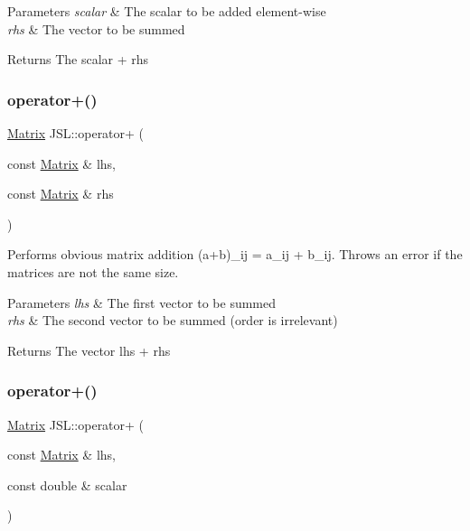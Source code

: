 \begin{DoxyParams}{Parameters}
{\em scalar} & The scalar to be added element-\/wise \\
\hline
{\em rhs} & The vector to be summed \\
\hline
\end{DoxyParams}
\begin{DoxyReturn}{Returns}
The scalar + rhs 
\end{DoxyReturn}
\mbox{\label{namespaceJSL_ad1bcc74167579ecff71209bf8c9c47a3}} 
\subsubsection{\texorpdfstring{operator+()}{operator+()}\hspace{0.1cm}{\footnotesize\ttfamily [4/6]}}
{\footnotesize\ttfamily \hyperlink{classJSL_1_1Matrix}{Matrix} J\+S\+L\+::operator+ (\begin{DoxyParamCaption}\item[{const \hyperlink{classJSL_1_1Matrix}{Matrix} \&}]{lhs,  }\item[{const \hyperlink{classJSL_1_1Matrix}{Matrix} \&}]{rhs }\end{DoxyParamCaption})\hspace{0.3cm}{\ttfamily [inline]}}



Performs obvious matrix addition (a+b)\+\_\+ij = a\+\_\+ij + b\+\_\+ij. Throws an error if the matrices are not the same size. 


\begin{DoxyParams}{Parameters}
{\em lhs} & The first vector to be summed \\
\hline
{\em rhs} & The second vector to be summed (order is irrelevant) \\
\hline
\end{DoxyParams}
\begin{DoxyReturn}{Returns}
The vector lhs + rhs 
\end{DoxyReturn}
\mbox{\label{namespaceJSL_ad779a68a2d565490f76dd16adfc3091e}} 
\subsubsection{\texorpdfstring{operator+()}{operator+()}\hspace{0.1cm}{\footnotesize\ttfamily [5/6]}}
{\footnotesize\ttfamily \hyperlink{classJSL_1_1Matrix}{Matrix} J\+S\+L\+::operator+ (\begin{DoxyParamCaption}\item[{const \hyperlink{classJSL_1_1Matrix}{Matrix} \&}]{lhs,  }\item[{const double \&}]{scalar }\end{DoxyParamCaption})\hspace{0.3cm}{\ttfamily [inline]}}



